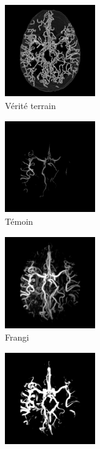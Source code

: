\begin{figure}[!ht]
  \captionsetup[subfigure]{justification=centering}
  \begin{subfigure}[t]{0.32\textwidth}
  \includegraphics[clip = true, trim = 90 20 90 20, height=4cm,width=3.9cm]{Images/Bullitt_GT.png}
  \caption{Vérité terrain}
\end{subfigure}
  \begin{subfigure}[t]{0.32\textwidth}
  \includegraphics[clip = true, trim = 90 20 90 20, height=4cm,width=3.9cm]{Images/Bullitt_Baseline.png}
  \caption{Témoin}
  \end{subfigure}
  \begin{subfigure}[t]{0.32\textwidth}
  \includegraphics[clip = true, trim = 90 20 90 20, height=4cm,width=3.9cm]{Images/Bullitt_Frangi.png}
  \caption{Frangi}
  \end{subfigure}
  \begin{subfigure}[t]{0.32\textwidth}
  \includegraphics[clip = true, trim = 90 20 90 20, height=4cm,width=3.9cm]{Images/Bullitt_Jerman.png}

\end{subfigure}
\end{figure}
